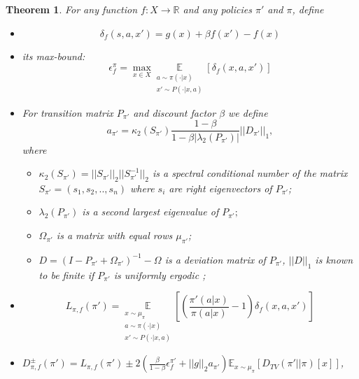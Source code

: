 \documentclass[11pt]{article}
\newcommand{\R}{\mathbb{R}}
\newcommand{\E}{\mathbb{E}}
\newtheorem{theorem}{Theorem}
\theoremstyle{definition}
\numberwithin{equation}{section}
\begin{document}
\begin{theorem}
For any function $f:X\rightarrow \R $ and any policies $\pi'$ and $\pi$, define


\begin{itemize}
  \item \begin{equation}
\delta_f(s, a, x') = g(x) +\beta f(x') - f(x)
\end{equation}
  \item its max-bound:
\begin{equation}
\epsilon_f^\pi = \max\limits_{x\in X} \underset{\substack{ a\sim \pi(\cdot|x)\\x'\sim P(\cdot|x, a)}}{\E}[\delta_f(x, a, x')]
\end{equation}

\item For transition matrix $P_{\pi'}$ and discount factor $\beta$ we define
\begin{equation}
 a_{\pi'} = \kappa_2(S_{\pi'})\frac{1-\beta}{ 1 - \beta|\lambda_2(P_{\pi'})|} || D_{\pi'} ||_1,
  \end{equation}
where

\begin{itemize}
  \item[*]  $\kappa_2(S_{\pi'}) = ||S_{\pi'}||_2||S_{\pi'}^{-1}||_2$ is a spectral conditional number of the matrix  $S_{\pi'} =(s_1, s_2, .., s_n)$ where $s_i$ are right eigenvectors of $P_{\pi'}$;
  \item[*] $\lambda_2(P_{\pi'})$ is a second largest eigenvalue of $P_{\pi'};$
  \item[*] $\Omega_{\pi'}$ is a matrix with equal rows $\mu_{\pi'}$;
  \item[*] $D = (I - P_{\pi'} +\Omega_{\pi'} )^{-1} -\Omega$ is a deviation matrix of $P_{\pi'}$, $||D||_1$ is known to be finite if $P_{\pi'}$ is uniformly ergodic \cite{Kartashov1985};
\end{itemize}









  \item \begin{equation}
L_{\pi,f}(\pi') =  \underset{\substack{ x\sim \mu_\pi\\ a\sim \pi(\cdot|x)\\x'\sim P(\cdot|x, a)}}{\E}\left[\left( \frac{\pi'(a| x)}{\pi(a|x)}-1 \right)\delta_f(x, a, x') \right]
\end{equation}
  \item $D_{\pi, f}^{\pm} (\pi') = L_{\pi,f}(\pi')\pm 2\left(\frac{\beta}{1-\beta}\epsilon_f^{\pi'} +  ||g||_2 a_{\pi'}\right) \E_{x\sim \mu_\pi}[D_{TV}(\pi'||\pi)[x]]$,


\end{itemize}
\end{theorem}
\end{document}

